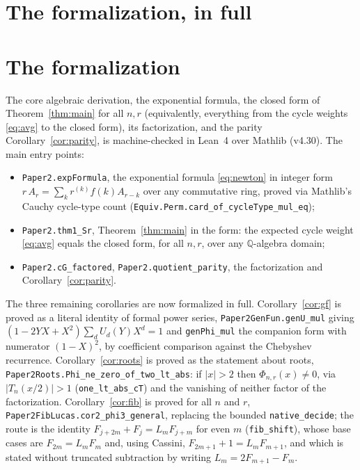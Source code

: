 \documentclass[11pt]{article}
\theoremstyle{remark}
\newcommand{\Q}{\mathbb{Q}}
\begin{document}
\section{The formalization, in full}

\appendix

\section{The formalization}

The core algebraic derivation, the exponential formula, the closed form of
Theorem~\ref{thm:main} for all $n,r$ (equivalently, everything from the cycle
weights \eqref{eq:avg} to the closed form), its factorization, and the parity
Corollary~\ref{cor:parity}, is machine-checked in Lean~4 over Mathlib (v4.30).
The main entry points:

\begin{itemize}
\item \texttt{Paper2.expFormula}, the exponential formula
  \eqref{eq:newton} in integer form
  $r\,A_r=\sum_k r^{(k)} f(k)A_{r-k}$ over any commutative ring, proved via
  Mathlib's Cauchy cycle-type count
  (\texttt{Equiv.Perm.\allowbreak card\_of\_\allowbreak cycleType\_mul\_eq});
\item \texttt{Paper2.thm1\_Sr}, Theorem~\ref{thm:main} in the form:
  the expected cycle weight \eqref{eq:avg} equals the closed form, for all
  $n,r$, over any $\Q$-algebra domain;
\item \texttt{Paper2.cG\_factored}, \texttt{Paper2.quotient\_parity}, the factorization and Corollary~\ref{cor:parity}.
\end{itemize}

The three remaining corollaries are now formalized in full.
Corollary~\ref{cor:gf} is proved as a literal identity of formal power series,
\texttt{Paper2GenFun.genU\_mul} giving
$(1-2YX+X^2)\sum_dU_d(Y)X^d=1$ and \texttt{genPhi\_mul} the companion form with numerator
$(1-X)^2$, by coefficient comparison against the Chebyshev recurrence.
Corollary~\ref{cor:roots} is proved as the statement about roots,
\texttt{Paper2Roots.Phi\_ne\_zero\_of\_two\_lt\_abs}: if $|x|>2$ then
$\Phi_{n,r}(x)\neq0$, via $|T_n(x/2)|>1$ (\texttt{one\_lt\_abs\_cT}) and the vanishing of
neither factor of the factorization.
Corollary~\ref{cor:fib} is proved for all $n$ and $r$,
\texttt{Paper2FibLucas.cor2\_phi3\_general}, replacing the bounded
\texttt{native\_decide}; the route is the identity $F_{j+2m}+F_j=L_mF_{j+m}$ for even $m$
(\texttt{fib\_shift}), whose base cases are $F_{2m}=L_mF_m$ and, using Cassini,
$F_{2m+1}+1=L_mF_{m+1}$, and which is stated without truncated subtraction by writing
$L_m=2F_{m+1}-F_m$.
\end{document}
